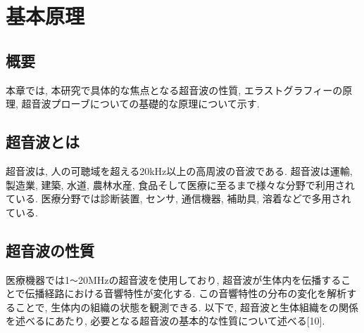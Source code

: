 \chapter{基本原理}
\newpage
\section{概要}
本章では, 本研究で具体的な焦点となる超音波の性質, エラストグラフィーの原理, 超音波プローブについての基礎的な原理について示す.

\section{超音波とは}
超音波は, 人の可聴域を超える20kHz以上の高周波の音波である. 超音波は運輸, 製造業, 建築, 水道, 農林水産, 食品そして医療に至るまで様々な分野で利用されている. 医療分野では診断装置, センサ, 通信機器, 補助具, 溶着などで多用されている. 

\section{超音波の性質}
医療機器では1\verb|〜|20MHzの超音波を使用しており, 超音波が生体内を伝播することで伝播経路における音響特性が変化する. この音響特性の分布の変化を解析することで, 生体内の組織の状態を観測できる. 以下で, 超音波と生体組織をの関係を述べるにあたり, 必要となる超音波の基本的な性質について述べる[10].
